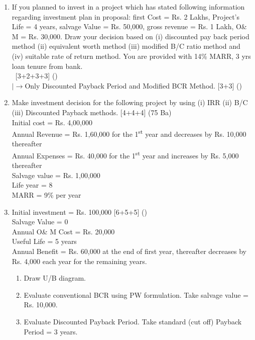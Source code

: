 \documentclass[12pt]{article}
\newcommand{\lb}{\\ $\left|\rightarrow\right.$}
\newcommand{\enter}{\\\textcolor{white}{1}}
\newcommand{\super}[1]{\textsuperscript{#1}}
\begin{document}
\begin{enumerate}
				\item If you planned to invest in a project which has stated following information regarding investment plan in proposal: first Cost = Rs. 2 Lakhs, Project's Life = 4 years, salvage Value = Rs. 50,000, gross revenue = Rs. 1 Lakh, O\& M = Rs. 30,000. Draw your decision based on (i) discounted pay back period method (ii) equivalent worth method (iii) modified B/C ratio method and (iv) suitable rate of return method. You are provided with 14\% MARR, 3 yrs loan tenure from bank. 
				\enter\hfill [3+2+3+3] ()
				\lb Only Discounted Payback Period and Modified BCR Method. \hfill [3+3] ()

				\item Make investment decision for the following project by using (i) IRR (ii) B/C (iii) Discounted Payback methods. \hfill [4+4+4] (75 Ba)\\
				Initial cost = Rs. 4,00,000\\
				Annual Revenue = Rs. 1,60,000 for the 1\super{st} year and decreases by Rs. 10,000 thereafter\\
				Annual Expenses = Rs. 40,000 for the 1\super{st} year and increases by Rs. 5,000 thereafter\\
				Salvage value = Rs. 1,00,000\\
				Life year = 8\\
				MARR = 9\% per year

				\item Initial investment = Rs. 100,000 \hfill [6+5+5] ()\\
				Salvage Value = 0\\
				Annual O\& M Cost = Rs. 20,000\\
				Useful Life = 5 years\\
				Annual Benefit = Rs. 60,000 at the end of first year, thereafter decreases by Rs. 4,000 each year for the remaining years.
				\begin{enumerate}[noitemsep, topsep = 0pt, label = \alph*.]
					\item Draw U/B diagram.
					\item Evaluate conventional BCR using PW formulation. Take salvage value = Rs. 10,000.
					\item Evaluate Discounted Payback Period. Take standard (cut off) Payback Period = 3 years.
				\end{enumerate}
			\end{enumerate}
\end{document}
